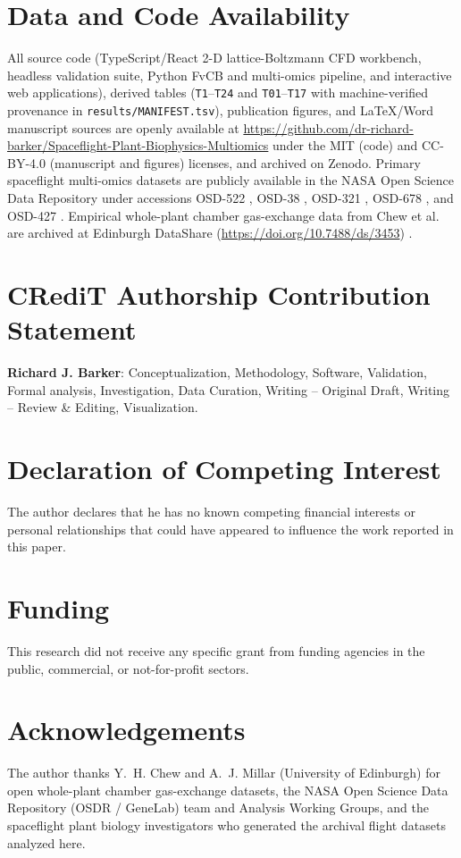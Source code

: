 \documentclass[preprint,11pt,numbers,sort&compress]{elsarticle}
\begin{document}
\section*{Data and Code Availability}

All source code (TypeScript/React 2-D lattice-Boltzmann CFD workbench, headless validation suite, Python FvCB and multi-omics pipeline, and interactive web applications), derived tables (\texttt{T1}--\texttt{T24} and \texttt{T01}--\texttt{T17} with machine-verified provenance in \texttt{results/MANIFEST.tsv}), publication figures, and LaTeX/Word manuscript sources are openly available at \url{https://github.com/dr-richard-barker/Spaceflight-Plant-Biophysics-Multiomics} under the MIT (code) and CC-BY-4.0 (manuscript and figures) licenses, and archived on Zenodo. Primary spaceflight multi-omics datasets are publicly available in the NASA Open Science Data Repository \citep{osdr2025} under accessions OSD-522 \citep{osd522}, OSD-38 \citep{osd38}, OSD-321 \citep{osd321}, OSD-678 \citep{osd678}, and OSD-427 \citep{osd427}. Empirical whole-plant chamber gas-exchange data from Chew et al.~\citep{chew2022} are archived at Edinburgh DataShare (\url{https://doi.org/10.7488/ds/3453}) \citep{chew2022data}.

\section*{CRediT Authorship Contribution Statement}
\textbf{Richard J. Barker}: Conceptualization, Methodology, Software, Validation, Formal analysis, Investigation, Data Curation, Writing -- Original Draft, Writing -- Review \& Editing, Visualization.

\section*{Declaration of Competing Interest}
The author declares that he has no known competing financial interests or personal relationships that could have appeared to influence the work reported in this paper.

\section*{Funding}
This research did not receive any specific grant from funding agencies in the public, commercial, or not-for-profit sectors.

\section*{Acknowledgements}
The author thanks Y.~H. Chew and A.~J. Millar (University of Edinburgh) for open whole-plant chamber gas-exchange datasets, the NASA Open Science Data Repository (OSDR / GeneLab) team and Analysis Working Groups, and the spaceflight plant biology investigators who generated the archival flight datasets analyzed here.



\end{document}
